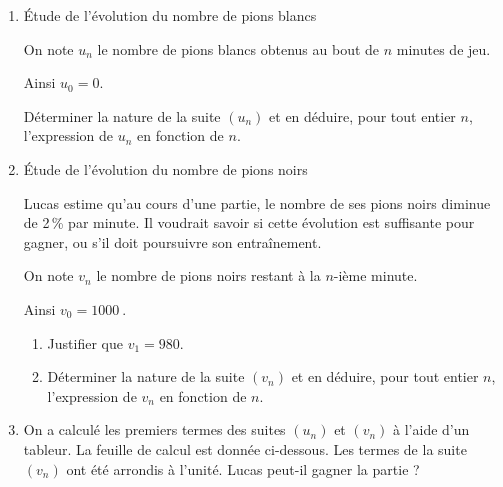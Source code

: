 \documentclass[10pt]{article}
\providecommand{\np}[2][]{{#2~#1}}
\begin{document}
\begin{enumerate}
\item Étude de l'évolution du nombre de pions blancs

On note $u_n$ le nombre de pions blancs obtenus au bout de $n$ minutes de jeu.

Ainsi $u_0 = 0$.

Déterminer la nature de la suite $\left(u_n\right)$ et en déduire, pour tout entier $n$, l'expression
de $u_n$ en fonction de $n$.
\item Étude de l'évolution du nombre de pions noirs

Lucas estime qu'au cours d'une partie, le nombre de ses pions noirs diminue de 2\,\%
par minute. Il voudrait savoir si cette évolution est suffisante pour gagner, ou s'il doit
poursuivre son entraînement.

On note $v_n$ le nombre de pions noirs restant à la $n$-ième minute.

Ainsi $v_0 = \np{1000}$.
\begin{enumerate}
\item Justifier que $v_1 = 980$.
\item Déterminer la nature de la suite $\left(v_n\right)$ et en déduire, pour tout entier $n$,
l'expression de $v_n$ en fonction de $n$.
\end{enumerate}
\item On a calculé les premiers termes des suites $\left(u_n\right)$ et $\left(v_n\right)$ à l'aide d'un tableur. La feuille de calcul est donnée ci-dessous.
Les termes de la suite $\left(v_n\right)$ ont été arrondis à l'unité.
Lucas peut-il gagner la partie ?


\end{enumerate}
\end{document}
